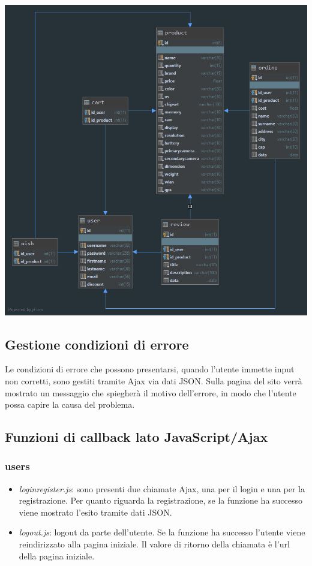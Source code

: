 \documentclass[12pt]{extarticle}
\begin{document}
\includegraphics[width=\linewidth]{diagram.png}

\subsection{Gestione condizioni di errore}
Le condizioni di errore che possono presentarsi, quando l'utente immette input non corretti, sono
gestiti tramite Ajax via dati JSON. Sulla pagina del sito verrà mostrato un messaggio che
spiegherà il motivo dell'errore, in modo che l'utente possa capire la causa del problema.

\subsection{Funzioni di callback lato JavaScript/Ajax}

\subsubsection*{users}
\begin{itemize}
    \item \textit{loginregister.js}: sono presenti due chiamate Ajax, una per il login e una per la registrazione.
    Per quanto riguarda la registrazione, se la funzione ha successo viene mostrato l'esito
    tramite dati JSON.
    \item \textit{logout.js}: logout da parte dell'utente. Se la funzione ha successo l'utente viene reindirizzato
    alla pagina iniziale. Il valore di ritorno della chiamata è l'url della pagina iniziale.
\end{itemize}
\end{document}
